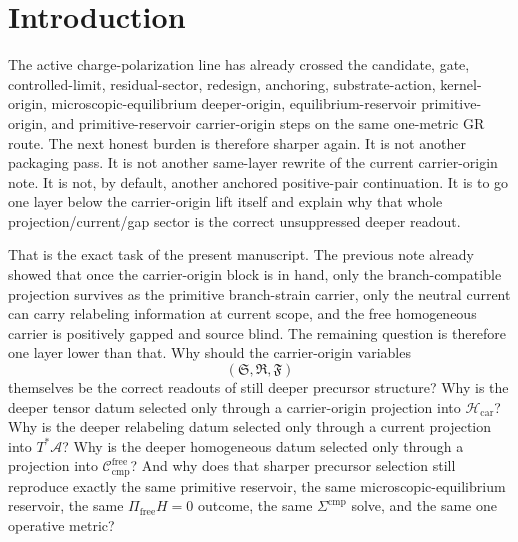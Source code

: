 \documentclass[11pt]{article}
\newcommand{\Sub}{\mathcal A}
\newcommand{\CompFree}{\mathscr C_{\mathrm{cmp}}^{\mathrm{free}}}
\newcommand{\CarrierClass}{\mathscr H_{\mathrm{car}}}
\newcommand{\CarrierSeed}{\mathfrak S}
\newcommand{\RelabelSeed}{\mathfrak R}
\newcommand{\FreeSeed}{\mathfrak F}
\begin{document}
\begin{abstract}
The result remains disciplined. This note does not claim a final ultraviolet completion or a uniqueness theorem for all deeper precursor sectors. Its positive claim is narrower and exact: the previously recorded carrier-origin projection/current/gap sector is now recovered as the low-selection stationary image of a still-deeper precursor layer while preserving the same primitive reservoir, the same microscopic-equilibrium reservoir, the same \(\Pi_{\mathrm{free}}H=0\) verdict, the same \(\Sigma^{\mathrm{cmp}}\) solve, and the same one-metric claim boundary.
\end{abstract}

\section{Introduction}

The active charge-polarization line has already crossed the candidate, gate, controlled-limit, residual-sector, redesign, anchoring, substrate-action, kernel-origin, microscopic-equilibrium deeper-origin, equilibrium-reservoir primitive-origin, and primitive-reservoir carrier-origin steps on the same one-metric GR route. The next honest burden is therefore sharper again. It is not another packaging pass. It is not another same-layer rewrite of the current carrier-origin note. It is not, by default, another anchored positive-pair continuation. It is to go one layer below the carrier-origin lift itself and explain why that whole projection/current/gap sector is the correct unsuppressed deeper readout.

That is the exact task of the present manuscript. The previous note already showed that once the carrier-origin block is in hand, only the branch-compatible projection survives as the primitive branch-strain carrier, only the neutral current can carry relabeling information at current scope, and the free homogeneous carrier is positively gapped and source blind. The remaining question is therefore one layer lower than that. Why should the carrier-origin variables
\[
(\CarrierSeed,\RelabelSeed,\FreeSeed)
\]
themselves be the correct readouts of still deeper precursor structure? Why is the deeper tensor datum selected only through a carrier-origin projection into \(\CarrierClass\)? Why is the deeper relabeling datum selected only through a current projection into \(T^*\Sub\)? Why is the deeper homogeneous datum selected only through a projection into \(\CompFree\)? And why does that sharper precursor selection still reproduce exactly the same primitive reservoir, the same microscopic-equilibrium reservoir, the same \(\Pi_{\mathrm{free}}H=0\) outcome, the same \(\Sigma^{\mathrm{cmp}}\) solve, and the same one operative metric?
\end{document}
